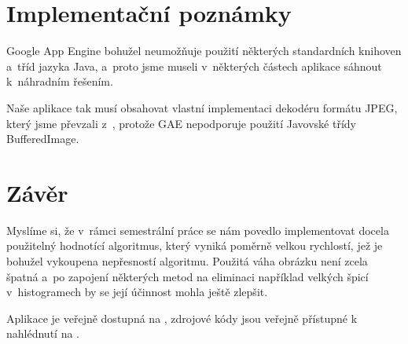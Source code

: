 \documentclass[12pt,oneside,a4paper]{article}
\begin{document}
\section{Implementační poznámky}

Google App Engine bohužel neumožňuje použití některých standardních knihoven a~tříd jazyka Java, a~proto jsme museli v~některých částech aplikace sáhnout k~náhradním řešením.

Naše aplikace tak musí obsahovat vlastní implementaci dekodéru formátu JPEG, který jsme převzali z~\cite{Dersch}, protože GAE nepodporuje použití Javovské třídy BufferedImage.

\section{Závěr}

Myslíme si, že v~rámci semestrální práce se nám povedlo implementovat docela použitelný hodnotící algoritmus, který vyniká poměrně velkou rychlostí, jež je bohužel vykoupena nepřesností algoritmu. Použitá váha obrázku není zcela špatná a~po zapojení některých metod na eliminaci například velkých špicí v~histogramech by se její účinnost mohla ještě zlepšit.

Aplikace je veřejně dostupná na \cite{liveApp}, zdrojové kódy jsou veřejně přístupné k nahlédnutí na \cite{official}.

\renewcommand{\refname}{Literatura}

{
 
}
\end{document}
